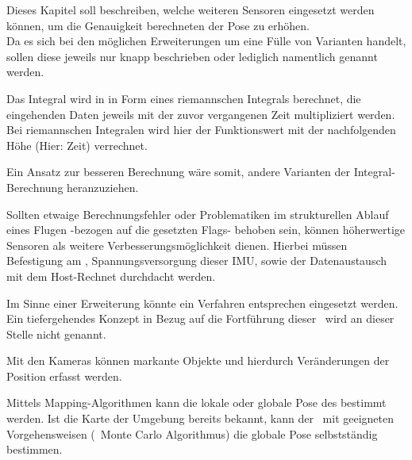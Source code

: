 
Dieses Kapitel soll beschreiben, welche weiteren Sensoren eingesetzt werden können, um die Genauigkeit berechneten der Pose zu erhöhen.\\
Da es sich bei den möglichen Erweiterungen um eine Fülle von Varianten handelt, sollen diese jeweils nur knapp beschrieben oder lediglich namentlich genannt werden.



Das Integral wird in  in Form eines riemannschen Integrals berechnet, die eingehenden Daten jeweils mit der zuvor vergangenen Zeit multipliziert werden. Bei riemannschen Integralen wird hier der Funktionswert mit der nachfolgenden Höhe (Hier: Zeit) verrechnet.

Ein Ansatz zur besseren Berechnung wäre somit, andere Varianten der Integral-Berechnung heranzuziehen.\\



Sollten etwaige Berechnungsfehler oder Problematiken im strukturellen Ablauf eines Flugen -bezogen auf die gesetzten Flags- behoben sein, können höherwertige Sensoren als weitere Verbesserungsmöglichkeit dienen. Hierbei müssen Befestigung am \Quad, Spannungsversorgung dieser IMU, sowie der Datenaustausch mit dem Host-Rechnet durchdacht werden.

Im Sinne einer Erweiterung könnte ein Verfahren entsprechen \cite{Paper4} eingesetzt werden. Ein tiefergehendes Konzept in Bezug auf die Fortführung dieser \Arbeit\ wird an dieser Stelle nicht genannt.



Mit den Kameras können markante Objekte und hierdurch Veränderungen der Position erfasst werden. 


Mittels Mapping-Algorithmen kann die lokale oder globale Pose des \Quad[s] bestimmt werden. Ist die Karte der Umgebung bereits bekannt, kann der \Quad\ mit geeigneten Vorgehensweisen (\zB\ Monte Carlo Algorithmus) die globale Pose selbstständig bestimmen.


